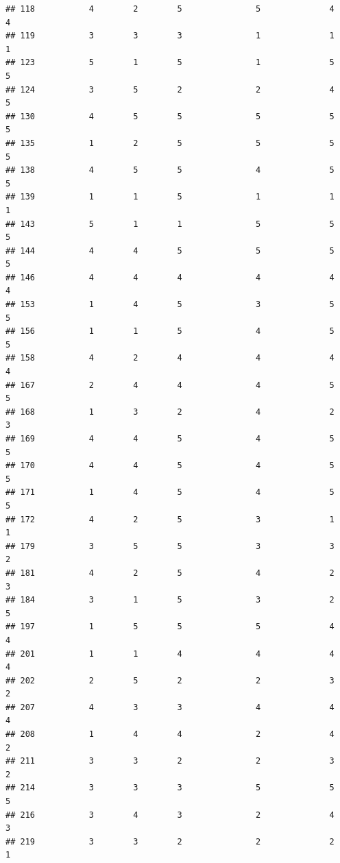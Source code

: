 \documentclass[
]{article}
\begin{document}
\begin{verbatim}
## 118           4        2        5               5              4             4
## 119           3        3        3               1              1             1
## 123           5        1        5               1              5             5
## 124           3        5        2               2              4             5
## 130           4        5        5               5              5             5
## 135           1        2        5               5              5             5
## 138           4        5        5               4              5             5
## 139           1        1        5               1              1             1
## 143           5        1        1               5              5             5
## 144           4        4        5               5              5             5
## 146           4        4        4               4              4             4
## 153           1        4        5               3              5             5
## 156           1        1        5               4              5             5
## 158           4        2        4               4              4             4
## 167           2        4        4               4              5             5
## 168           1        3        2               4              2             3
## 169           4        4        5               4              5             5
## 170           4        4        5               4              5             5
## 171           1        4        5               4              5             5
## 172           4        2        5               3              1             1
## 179           3        5        5               3              3             2
## 181           4        2        5               4              2             3
## 184           3        1        5               3              2             5
## 197           1        5        5               5              4             4
## 201           1        1        4               4              4             4
## 202           2        5        2               2              3             2
## 207           4        3        3               4              4             4
## 208           1        4        4               2              4             2
## 211           3        3        2               2              3             2
## 214           3        3        3               5              5             5
## 216           3        4        3               2              4             3
## 219           3        3        2               2              2             1

\end{verbatim}
\end{document}
